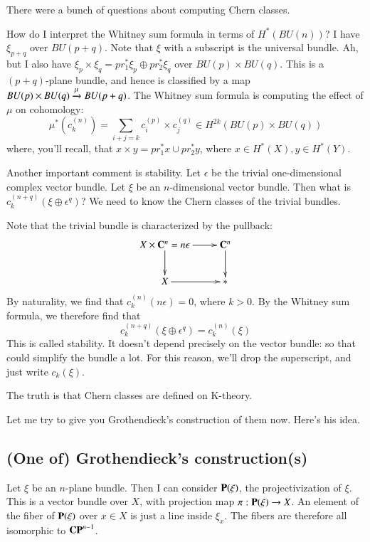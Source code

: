 There were a bunch of questions about computing Chern classes.

How do I interpret the Whitney sum formula in terms of $H^\ast(BU(n))$?
I have $\xi_{p+q}$ over $BU(p+q)$.
Note that $\xi$ with a subscript is the universal bundle.
Ah, but I also have $\xi_p\times \xi_q = pr_1^\ast \xi_p\oplus pr_2^\ast\xi_q$ over $BU(p)\times BU(q)$.
This is a $(p+q)$-plane bundle, and hence is classified by a map $BU(p)\times BU(q) \xrightarrow{{\mu}} BU(p+q)$.
The Whitney sum formula is computing the effect of $\mu$ on cohomology:
$$
\mu^\ast(c^{(n)}_k) = \sum_{i+j = k} c^{(p)}_i \times c^{(q)}_j \in H^{2k}(BU(p)\times BU(q))
$$
where, you'll recall, that $x\times y = pr_1^\ast x \cup pr_2^\ast y$, where $x\in H^\ast(X),y\in H^\ast(Y)$.

Another important comment is stability.
Let $\epsilon$ be the trivial one-dimensional complex vector bundle.
Let $\xi$ be an $n$-dimensional vector bundle.
Then what is $c^{(n+q)}_k(\xi\oplus\epsilon^q)$?
We need to know the Chern classes of the trivial bundles.

Note that the trivial bundle is characterized by the pullback:
\begin{equation*}
    \xymatrix{
	X\times \cc^n = n\epsilon \ar[r]\ar[d] & \cc^n\ar[d]\\
	X\ar[r] & \ast
    }
\end{equation*}
By naturality, we find that $c^{(n)}_k(n\epsilon) = 0$, where $k>0$.
By the Whitney sum formula, we therefore find that
$$
c^{(n+q)}_k(\xi\oplus \epsilon^q) = c^{(n)}_k(\xi)
$$
This is called stability.
It doesn't depend precisely on the vector bundle: so that could simplify the bundle a lot.
For this reason, we'll drop the superscript, and just write $c_k(\xi)$.

The truth is that Chern classes are defined on K-theory.

Let me try to give you Grothendieck's construction of them now.
Here's his idea.
\subsection{(One of) Grothendieck's construction(s)}
Let $\xi$ be an $n$-plane bundle.
Then I can consider $\mathbf P(\xi)$, the projectivization of $\xi$.
This is a vector bundle over $X$, with projection map $\pi:\mathbf P(\xi) \to X$.
An element of the fiber of $\mathbf P(\xi)$ over $x\in X$ is just a line inside $\xi_x$.
The fibers are therefore all isomorphic to $\mathbf{CP}^{n-1}$.

